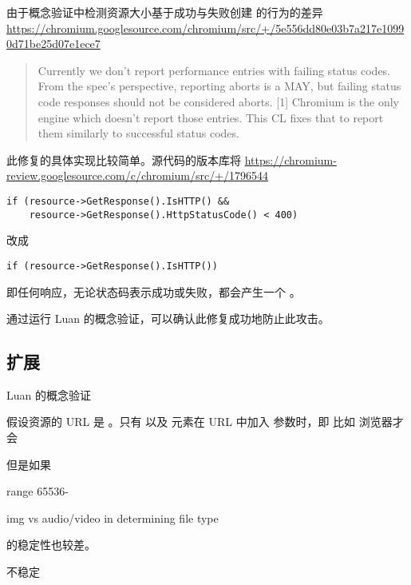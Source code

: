 由于概念验证中检测资源大小基于成功与失败创建  的行为的差异 \url{https://chromium.googlesource.com/chromium/src/+/5e556dd80e03b7a217e10990d71be25d07e1ece7}

\begin{quote}
    Currently we don't report performance entries with failing status codes.
    From the spec's perspective, reporting aborts is a MAY, but failing
    status code responses should not be considered aborts. [1]
    Chromium is the only engine which doesn't report those entries.
    This CL fixes that to report them similarly to successful status codes.
\end{quote}

此修复的具体实现比较简单。源代码的版本库将 \url{https://chromium-review.googlesource.com/c/chromium/src/+/1796544}

\begin{lstlisting}
if (resource->GetResponse().IsHTTP() &&
    resource->GetResponse().HttpStatusCode() < 400)
\end{lstlisting}

改成 

\begin{lstlisting}
if (resource->GetResponse().IsHTTP())
\end{lstlisting}


即任何响应，无论状态码表示成功或失败，都会产生一个 。


通过运行 Luan 的概念验证，可以确认此修复成功地防止此攻击。

\subsection{扩展}

Luan 的概念验证

假设资源的 URL 是 。只有  以及  元素在 URL 中加入  参数时，即 比如 浏览器才会


但是如果


range 65536-

img vs audio/video in determining file type

 的稳定性也较差。


不稳定